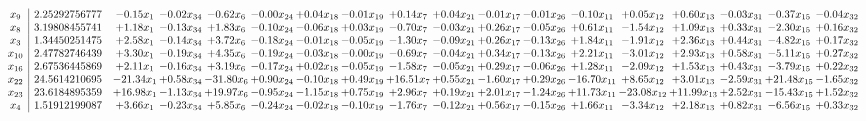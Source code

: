 \documentclass[9pt]{article}
\begin{document}
 \[\begin{array}{c| c c@{\hskip 2pt} c@{\hskip 2pt} c@{\hskip 2pt} c@{\hskip 2pt} c@{\hskip 2pt} c@{\hskip 2pt} c@{\hskip 2pt} c@{\hskip 2pt} c@{\hskip 2pt} c@{\hskip 2pt} c@{\hskip 2pt} c@{\hskip 2pt} c@{\hskip 2pt} c@{\hskip 2pt} c@{\hskip 2pt} c@{\hskip 2pt} }
 x_{9}   &  2.25292756777 & -0.15 x_{1} & -0.02 x_{34} & -0.62 x_{6} & -0.00 x_{24} & +  0.04 x_{18} & -0.01 x_{19} & +  0.14 x_{7} & +  0.04 x_{21} & -0.01 x_{17} & -0.01 x_{26} & -0.10 x_{11} & +  0.05 x_{12} & +  0.60 x_{13} & -0.03 x_{31} & -0.37 x_{15} & -0.04 x_{32}\\
 x_{8}   &  3.19808455741 & +  1.18 x_{1} & -0.13 x_{34} & +  1.83 x_{6} & -0.10 x_{24} & -0.06 x_{18} & +  0.03 x_{19} & -0.70 x_{7} & -0.03 x_{21} & +  0.26 x_{17} & -0.05 x_{26} & +  0.61 x_{11} & -1.54 x_{12} & +  1.09 x_{13} & +  0.33 x_{31} & -2.30 x_{15} & +  0.16 x_{32}\\
 x_{3}   &  1.34450251475 & +  2.58 x_{1} & -0.14 x_{34} & +  3.72 x_{6} & -0.18 x_{24} & -0.01 x_{18} & -0.05 x_{19} & -1.30 x_{7} & -0.09 x_{21} & +  0.26 x_{17} & -0.13 x_{26} & +  1.84 x_{11} & -1.91 x_{12} & +  2.36 x_{13} & +  0.44 x_{31} & -4.82 x_{15} & +  0.17 x_{32}\\
 x_{10}   &  2.47782746439 & +  3.30 x_{1} & -0.19 x_{34} & +  4.35 x_{6} & -0.19 x_{24} & -0.03 x_{18} & -0.00 x_{19} & -0.69 x_{7} & -0.04 x_{21} & +  0.34 x_{17} & -0.13 x_{26} & +  2.21 x_{11} & -3.01 x_{12} & +  2.93 x_{13} & +  0.58 x_{31} & -5.11 x_{15} & +  0.27 x_{32}\\
 x_{16}   &  2.67536445869 & +  2.11 x_{1} & -0.16 x_{34} & +  3.19 x_{6} & -0.17 x_{24} & +  0.02 x_{18} & -0.05 x_{19} & -1.58 x_{7} & -0.05 x_{21} & +  0.29 x_{17} & -0.06 x_{26} & +  1.28 x_{11} & -2.09 x_{12} & +  1.53 x_{13} & +  0.43 x_{31} & -3.79 x_{15} & +  0.22 x_{32}\\
 x_{22}   &  24.5614210695 & -21.34 x_{1} & +  0.58 x_{34} & -31.80 x_{6} & +  0.90 x_{24} & -0.10 x_{18} & +  0.49 x_{19} & + 16.51 x_{7} & +  0.55 x_{21} & -1.60 x_{17} & +  0.29 x_{26} & -16.70 x_{11} & +  8.65 x_{12} & +  3.01 x_{13} & -2.59 x_{31} & + 21.48 x_{15} & -1.65 x_{32}\\
 x_{23}   &  23.6184895359 & + 16.98 x_{1} & -1.13 x_{34} & + 19.97 x_{6} & -0.95 x_{24} & -1.15 x_{18} & +  0.75 x_{19} & +  2.96 x_{7} & +  0.19 x_{21} & +  2.01 x_{17} & -1.24 x_{26} & + 11.73 x_{11} & -23.08 x_{12} & + 11.99 x_{13} & +  2.52 x_{31} & -15.43 x_{15} & +  1.52 x_{32}\\
 x_{4}   &  1.51912199087 & +  3.66 x_{1} & -0.23 x_{34} & +  5.85 x_{6} & -0.24 x_{24} & -0.02 x_{18} & -0.10 x_{19} & -1.76 x_{7} & -0.12 x_{21} & +  0.56 x_{17} & -0.15 x_{26} & +  1.66 x_{11} & -3.34 x_{12} & +  2.18 x_{13} & +  0.82 x_{31} & -6.56 x_{15} & +  0.33 x_{32}\\

\end{array}\]
\end{document}
